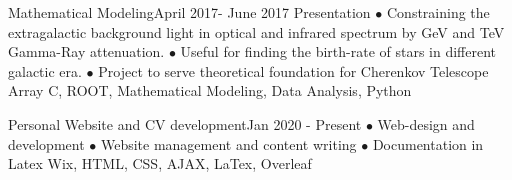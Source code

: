 \begin{projects}
   \project
    {Mathematical Modeling}{April 2017- June 2017}
    {  {Presentation} }
    {$\bullet$ Constraining the extragalactic background light in optical and infrared spectrum by GeV and TeV Gamma-Ray attenuation. $\bullet$ Useful for finding the birth-rate of stars in different galactic era. $\bullet$ Project to serve theoretical foundation for Cherenkov Telescope Array}
    {C, ROOT, Mathematical Modeling, Data Analysis, Python}
    
   \project   
    {Personal Website and CV development}{Jan 2020 - Present}
    { }
    {$\bullet$ Web-design and development $\bullet$ Website management and content writing  $\bullet$ Documentation in Latex}
    {Wix, HTML, CSS, AJAX, LaTex, Overleaf}
        
\end{projects}